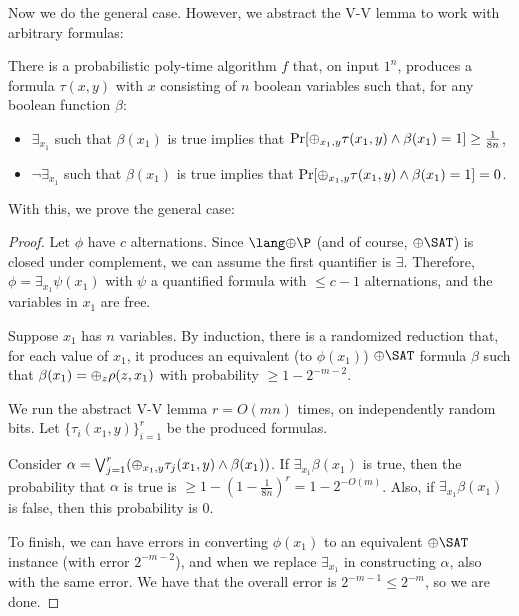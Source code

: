 \par Now we do the general case. However, we abstract the V-V lemma to work with arbitrary formulas:
\begin{lemma}
There is a probabilistic poly-time algorithm $f$ that, on input $1^n$, produces a formula $\tau(x, y)$ with $x$ consisting of $n$ boolean variables such that, for any boolean function $\beta$:
\begin{itemize}
\item $\exists_{x_1}$ such that $\beta(x_1)$ is true implies that $\Pr[\oplus_{x_1,y}\tau(x_1,y) \wedge \beta(x_1) = 1] \ge \frac{1}{8n}$,
\item $\neg\exists_{x_1}$ such that $\beta(x_1)$ is true implies that $\Pr[\oplus_{x_1,y}\tau(x_1,y) \wedge \beta(x_1) = 1] = 0$.
\end{itemize}
\end{lemma}
With this, we prove the general case:
\begin{proof}
Let $\phi$ have $c$ alternations. Since $\ParityP$ (and of course, $\ParitySAT$) is closed under complement, we can assume the first quantifier is $\exists$. Therefore, $\phi = \exists_{x_1}\psi(x_1)$ with $\psi$ a quantified formula with $\le c-1$ alternations, and the variables in $x_1$ are free.

\par Suppose $x_1$ has $n$ variables. By induction, there is a randomized reduction that, for each value of $x_1$, it produces an equivalent (to $\phi(x_1)$) $\ParitySAT$ formula $\beta$ such that $\beta(x_1) = \oplus_z \rho(z, x_1)$ with probability $\ge 1-2^{-m-2}$. 

\par We run the abstract V-V lemma $r = O(mn)$ times, on independently random bits. Let $\{\tau_i (x_1, y)\}_{i=1}^r$ be the produced formulas.

\par Consider $\alpha = \bigvee_{j=1}^{r} (\oplus_{x_1, y} \tau_j(x_1, y) \wedge \beta(x_1))$. If $\exists_{x_1}\beta(x_1)$ is true, then the probability that $\alpha$ is true is $\ge 1-(1-\frac{1}{8n})^r = 1-2^{-O(m)}$. Also, if $\exists_{x_1}\beta(x_1)$ is false, then this probability is 0. 

\par To finish, we can have errors in converting $\phi(x_1)$ to an equivalent $\ParitySAT$ instance (with error $2^{-m-2}$), and when we replace $\exists_{x_1}$ in constructing $\alpha$, also with the same error. We have that the overall error is $2^{-m-1} \le 2^{-m}$, so we are done.
\end{proof}

